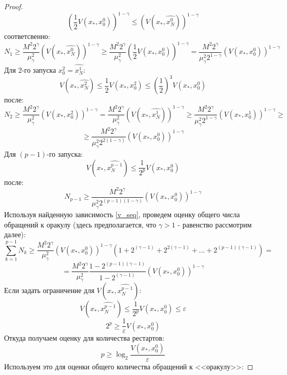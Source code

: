 \begin{proof}
$$       $$
       $$
            (\frac{1}{2} V(x_*, x_0^0))^{1 - \gamma} \leq (V(x_*, \widehat{x_N^0}))^{1 - \gamma}
       $$
       соответсвенно:
       $$
           N_1 \geq \frac{M^2 2^{\gamma}}{\mu_{\gamma}^2} (V(x_*, \widehat{x_N^0}))^{1 - \gamma} \geq \frac{M^2 2^{\gamma}}{\mu_{\gamma}^2} (\frac{1}{2} V(x_*, x_0^0))^{1 - \gamma} = \frac{M^2 2^{\gamma}}{\mu_{\gamma}^2 2^{1-\gamma}} (V(x_*, x_0^0))^{1 - \gamma}
       $$
       Для 2-го запуска $x_0^2 = \widehat{x_N^1}$:
       $$
           V(x_*, \widehat{x_N^2}) \leq \frac{1}{2} V(x_*, x_0^2) \leq (\frac{1}{2})^3 V(x_*, x_0^0) 
       $$
       после:
       $$
           N_2 \geq \frac{M^2 2^{\gamma}}{\mu_{\gamma}^2} (V(x_*, x_0^2))^{1 - \gamma} = \frac{M^2 2^{\gamma}}{\mu_{\gamma}^2} (V(x_*, \widehat{x_N^1}))^{1 - \gamma} \geq \frac{M^2 2^{\gamma}}{\mu_{\gamma}^2 2^{1 - \gamma}} (V(x_*, x_0^1))^{1 - \gamma} \geq 
       $$
       $$
           \geq \frac{M^2 2^{\gamma}}{\mu_{\gamma}^2 2^{2(1 - \gamma)}} (V(x_*, x_0^0))^{1 - \gamma} 
       $$
       Для $(p-1)$-го запуска:
       \begin{equation} \label{v_seq}
           V(x_*, \widehat{x_N^{p-1}}) \leq \frac{1}{2^p} V(x_*, x_0^0)
       \end{equation}
       после:
       \begin{equation} \label{n_seq}
           N_{p-1} \geq \frac{M^2 2^{\gamma}}{\mu_{\gamma}^2 2^{(p - 1)(1 - \gamma)}} (V(x_*, x_0^0))^{1 - \gamma}
       \end{equation}
       Используя найденную зависимость \ref{v_seq}, проведем оценку общего числа обращений к оракулу (здесь предполагается, что $\gamma > 1$ - равенство рассмотрим далее):
       $$
           \sum_{k=1}^{p - 1} N_k \geq \frac{M^2 2^{\gamma}}{\mu_{\gamma}^2} (V(x_*, x_0^0))^{1 - \gamma} (1 + 2^{(\gamma-1)} + 2^{2(\gamma - 1)} + ... + 2^{(p-1)(\gamma - 1)}) = 
       $$
       $$
           = \frac{M^2 2^{\gamma}}{\mu_{\gamma}^2} \frac{1 - 2^{(p-1)(\gamma-1)}}{1 - 2^{(\gamma-1)}} (V(x_*, x_0^0))^{1 - \gamma}
       $$
       Если задать ограничение для $V(x_*, \widehat{x_N^{p-1}})$:
       $$
           V(x_*, \widehat{x_N^{p-1}}) \leq \frac{1}{2^p} V(x_*, x_0^0) \leq \varepsilon
       $$
       $$
            2^p \geq \frac{1}{\varepsilon} V(x_*, x_0^0)
       $$
       Откуда получаем оценку для количества рестартов:
       \begin{equation}
            p \geq \log_2{\frac{V(x_*, x_0^0)}{\varepsilon}}
       \end{equation}
       Используем это для оценки общего количества обращений к <<оракулу>>:

\end{proof}
